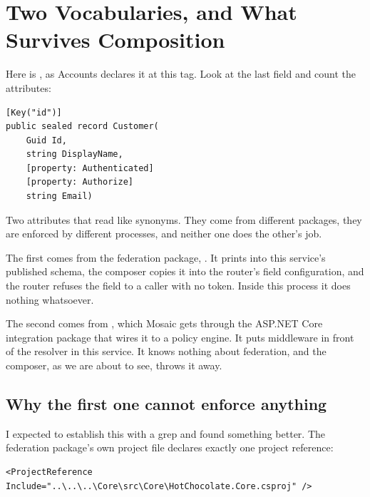 \section{Two Vocabularies, and What Survives Composition}
\label{sec:ch15-two-vocabularies}
%

Here is , as Accounts declares it at this tag. Look at the last
field and count the attributes:

\begin{verbatim}
[Key("id")]
public sealed record Customer(
    Guid Id,
    string DisplayName,
    [property: Authenticated]
    [property: Authorize]
    string Email)
\end{verbatim}

Two attributes that read like synonyms. They come from different packages, they
are enforced by different processes, and neither one does the other's job.

%
The first comes from the federation package,
. It prints  into this
service's published schema, the composer copies it into the router's field
configuration, and the router refuses the field to a caller with no token.
Inside this process it does nothing whatsoever.

%
The second comes from , which Mosaic gets
through the ASP.NET Core integration package that wires it to a policy engine.
It puts middleware in front of the resolver in this service. It knows nothing
about federation, and the composer, as we are about to see, throws it away.

\subsection*{Why the first one cannot enforce anything}

%
I expected to establish this with a grep and found something better. The
federation package's own project file declares exactly one project reference:

\begin{verbatim}
<ProjectReference Include="..\..\..\Core\src\Core\HotChocolate.Core.csproj" />
\end{verbatim}

